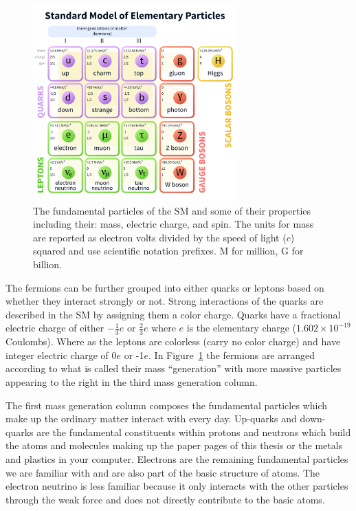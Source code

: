 \begin{figure}[htbp]
\centering
     \includegraphics[width=0.7\textwidth]{introduction/plots/Standard_Model_of_Elementary_Particles.pdf}
     \caption{
The fundamental particles of the SM and some of their properties including their:
mass, electric charge, and spin. The units for mass are reported as electron volts divided by
the speed of light ($c$) squared and use scientific notation prefixes.
M for million, G for billion.
     }
     \label{fig:sm_particles}
\end{figure}

The fermions can be further grouped into either quarks or leptons based on whether
they interact strongly or not. Strong interactions of the quarks are described in the SM by assigning them a 
color charge. Quarks have a fractional electric charge of either $-\frac{1}{3}e$ or $\frac{2}{3}e$
where $e$ is the elementary charge ($1.602 \times 10^{-19}$ Coulombs).
Where as the leptons are colorless (carry no color charge) and
have integer electric charge of 0$e$ or -1$e$. In Figure~\ref{fig:sm_particles} the fermions are
arranged according to what is called their mass ``generation'' with more massive
particles appearing to the right in the third mass generation column.

The first
mass generation column composes the fundamental particles which make up the ordinary matter
interact with every day. Up-quarks and down-quarks are the fundamental constituents within
protons and neutrons which build the atoms and molecules
making up the paper pages of this thesis or the metals and plastics in your computer.
Electrons are the
remaining fundamental particles we are familiar with and are also part of the basic 
structure of atoms. The electron neutrino is less familiar because it only
interacts with the other particles through the weak force and does not directly
contribute to the basic atoms.

